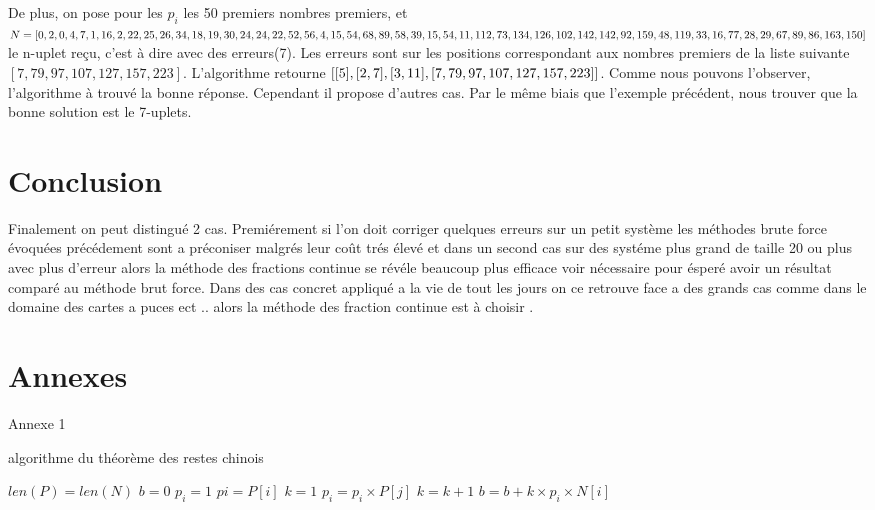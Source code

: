 \documentclass[a4paper, 11pt]{report}
\begin{document}
De plus, on pose pour les $p_i$ les 50 premiers nombres premiers, et 
$N=[0, 2, 0, 4, 7, 1, 16, 2, 22, 25, 26, 34, 18, 19, 30, 24, 24, 22, 52, 56, 4, 15, 54, 68, 
89,\newline 58, 39, 15, 54, 11, 112, 73, 134, 126, 102, 142, 142, 92, 159, 48, 119, 33, 16, 77, 28,
 \newline 29, 67, 89, 86, 163, 150]$ le n-uplet reçu, c'est à dire avec des erreurs(7). 
Les erreurs sont sur les positions correspondant aux nombres premiers de la liste suivante $[7, 79, 97, 107, 127, 157, 223]$. 
L'algorithme retourne $[[5], [2, 7], [3, 11], [7, 79, 97,\newline 107, 127, 157, 223]]$. Comme nous pouvons l'observer, l'algorithme à trouvé la bonne réponse. Cependant il propose d'autres cas. Par le même biais que l'exemple précédent, nous trouver que la bonne solution est le 7-uplets.


\newpage
 
\chapter*{Conclusion}
Finalement on peut distingué 2 cas. Premiérement si l'on doit corriger quelques erreurs sur un petit système 
les méthodes brute force évoquées précédement sont a préconiser malgrés leur coût trés élevé
et dans un second cas sur des systéme plus grand de taille 20 ou plus avec plus d'erreur alors la méthode des fractions continue
se révéle beaucoup plus efficace voir nécessaire pour ésperé avoir un résultat comparé au méthode brut force.
Dans des cas concret appliqué a la vie de tout les jours on ce retrouve face a des grands cas comme dans le domaine des cartes a puces ect ..
alors la méthode des fraction continue est à choisir .
\newpage

\chapter*{Annexes}
\begin{appendices}
    Annexe 1
    \begin{algorithm}
        \caption{algorithme du théorème des restes chinois}
        \begin{algorithmic}
            \REQUIRE $len(P)=len(N)$
            \STATE $b=0$
            \STATE $p_i=1$
            \STATE $pi=P[i]$
            \STATE $k=1$
            \STATE $p_i=p_i\times P[j]$
            \ENDIF
            \ENDFOR
            \STATE $k=k+1$
            \ENDWHILE
            \STATE $b=b+k\times p_i \times N[i] $
            \ENDFOR
        \end{algorithmic}
    \end{algorithm}
\end{appendices}
\end{document}
